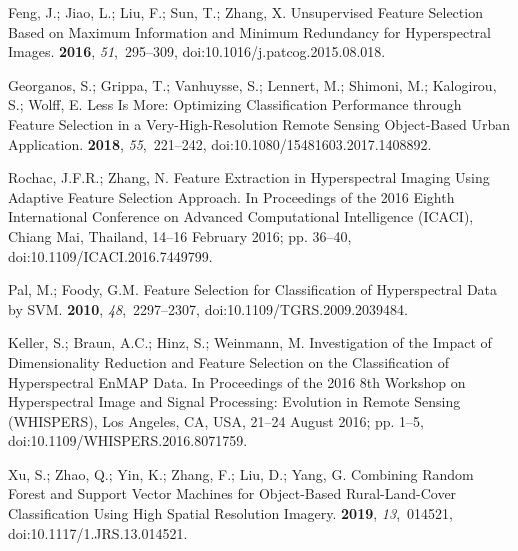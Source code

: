 \documentclass[remotesensing,article,accept,moreauthors,pdftex]{Definitions/mdpi}
\begin{document}
\begin{thebibliography}{999}
Feng, J.; Jiao, L.; Liu, F.; Sun, T.; Zhang, X.
\newblock Unsupervised Feature Selection Based on Maximum Information and
  Minimum Redundancy for Hyperspectral Images.
 {\bf 2016}, {\em 51},~295--309, doi:10.1016/j.patcog.2015.08.018.

Georganos, S.; Grippa, T.; Vanhuysse, S.; Lennert, M.; Shimoni, M.; Kalogirou,
  S.; Wolff, E.
\newblock Less Is More: Optimizing Classification Performance through Feature
  Selection in a Very-High-Resolution Remote Sensing Object-Based Urban
  Application.
 {\bf 2018}, {\em 55},~221--242, doi:10.1080/15481603.2017.1408892.

Rochac, J.F.R.; Zhang, N.
\newblock Feature Extraction in Hyperspectral Imaging Using Adaptive Feature
  Selection Approach.
\newblock  In Proceedings of the 2016 {{Eighth International Conference}} on {{Advanced Computational
  Intelligence}} ({{ICACI}}),  Chiang Mai, Thailand, 14--16 February 2016; pp. 36--40, doi:10.1109/ICACI.2016.7449799.

Pal, M.; Foody, G.M.
\newblock Feature {{Selection}} for {{Classification}} of {{Hyperspectral
  Data}} by {{SVM}}.
 {\bf 2010},
  {\em 48},~2297--2307, doi:10.1109/TGRS.2009.2039484.

Keller, S.; Braun, A.C.; Hinz, S.; Weinmann, M.
\newblock Investigation of the Impact of Dimensionality Reduction and Feature
  Selection on the Classification of Hyperspectral {{EnMAP}} Data.
\newblock  In Proceedings of the 2016 8th {{Workshop}} on {{Hyperspectral Image}} and {{Signal
  Processing}}: Evolution in {{Remote Sensing}} ({{WHISPERS}}),  Los Angeles, CA, USA, 21--24 August 2016; pp. 1--5, doi:10.1109/WHISPERS.2016.8071759.

Xu, S.; Zhao, Q.; Yin, K.; Zhang, F.; Liu, D.; Yang, G.
\newblock Combining Random Forest and Support Vector Machines for Object-Based
  Rural-Land-Cover Classification Using High Spatial Resolution Imagery.
 {\bf 2019}, {\em 13},~014521, doi:10.1117/1.JRS.13.014521.


\end{thebibliography}
\end{document}
